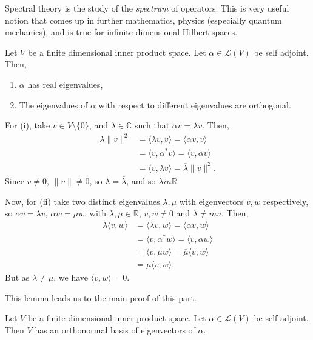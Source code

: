 \documentclass[12pt]{article}
\begin{document}
Spectral theory is the study of the \textit{spectrum} of operators. This is very useful notion that comes up in further mathematics, physics (especially quantum mechanics), and is true for infinite dimensional Hilbert spaces.

\begin{lemma}
	Let $V$ be a finite dimensional inner product space. Let $\alpha \in \mathcal{L}(V)$ be self adjoint. Then,
	\begin{enumerate}[\normalfont(i)]
		\item $\alpha$ has real eigenvalues,
		\item The eigenvalues of $\alpha$ with respect to different eigenvalues are orthogonal.
	\end{enumerate}
\end{lemma}

\begin{proofbox}
	For (i), take $v \in V \setminus \{0\}$, and $\lambda \in \mathbb{C}$ such that $\alpha v = \lambda v$. Then,
	\begin{align*}
		\lambda \|v\|^2 &= \langle \lambda v, v \rangle = \langle \alpha v, v \rangle \\
				&= \langle v, \alpha^{\ast} v \rangle = \langle v, \alpha v \rangle \\
				&= \langle v, \lambda v \rangle = \overline{\lambda} \|v\|^2.
	\end{align*}
	Since $v \neq 0$, $\|v\| \neq 0$, so $\lambda = \overline{\lambda}$, and so $\lambda in \mathbb{R}$.

	Now, for (ii) take two distinct eigenvalues $\lambda, \mu$ with eigenvectors $v, w$ respectively, so $\alpha v = \lambda v$, $\alpha w = \mu w$, with $\lambda, \mu \in \mathbb{R}$, $v, w \neq 0$ and $\lambda \neq mu$. Then,
	\begin{align*}
		\lambda \langle v, w\rangle &= \langle \lambda v, w \rangle = \langle \alpha v , w \rangle \\
					    &= \langle v, \alpha^{\ast} w \rangle = \langle v, \alpha w \rangle \\
					    &= \langle v, \mu w \rangle = \overline{\mu}\langle v, w \rangle \\
					    &= \mu \langle v, w \rangle.
	\end{align*}
	But as $\lambda \neq \mu$, we have $\langle v, w \rangle = 0$.
\end{proofbox}

This lemma leads us to the main proof of this part.

\begin{theorem}
	Let $V$ be a finite dimensional inner product space. Let $\alpha \in \mathcal{L}(V)$ be self adjoint. Then $V$ has an orthonormal basis of eigenvectors of $\alpha$.
\end{theorem}
\end{document}
